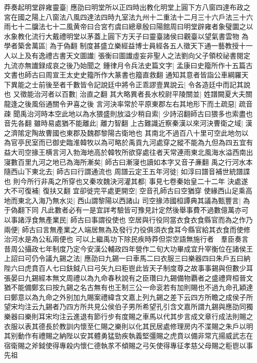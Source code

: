 莽奏起明堂辟雍靈臺|{
	應劭曰明堂所以正四時出教化明堂上圓下方八窗四達布政之宮在國之陽上八窗法八風四達法四時九室法九州十二重法十二月三十六戶法三十六雨七十二牖法七十二風黄帝曰合宮冇虞曰總章殷曰陽館周曰明堂辟雍者象璧圜之以水象教化流行大戴禮明堂以茅蓋上圓下方天子曰靈臺諸侯曰觀臺以望氣書雲物}
為學者築舍萬區|{
	為于偽翻}
制度甚盛立樂經益博士員經各五人徵天下通一藝教授十一人以上及有逸禮古書天文圖䜟|{
	張衡曰圖䜟虛妄非聖人之法劉向父子領校祕書閱定九流亦無䜟録成哀之後乃始聞之}
鍾律月令兵法史篇文字|{
	孟康曰史籀所作十五篇古文書也師古曰周宣王太史史籀所作大篆書也籀直救翻}
通知其意者皆詣公車綱羅天下異能之士前後至者千數皆令記說廷中將令正乖謬壹異說云|{
	令各造廷中而記其說也}
又徵能治河者以百數|{
	治直之翻}
其大略異者長水校尉平陵關並|{
	姓譜闕夏大夫關龍逢之後風俗通關令尹喜之後}
言河決率常於平原東郡左右其地形下而土疏惡|{
	疏音疎}
聞禹治河時本空此地以為水猥盛則放溢少稍自索|{
	少詩沼翻師古曰猥多也索盡也音先各翻}
雖時易處猶不能離此|{
	離力智翻}
上古難識近察秦漢以來河決曹衛之域|{
	漢之濟隂定陶故曹國也東郡及魏郡黎陽古衛地也}
其南北不過百八十里可空此地勿以為官亭民室而已御史臨淮韓牧以為可略於禹貢九河處穿之縱不能為九但為四五宜有益大司空掾王横言河入勃海地高於韓牧所欲穿處往者天常連雨東北風海水溢西南出寖數百里九河之地已為海所漸矣|{
	師古曰漸寖也讀如本字又音子亷翻}
禹之行河水本隨西山下東北去|{
	師古曰行謂通流也}
周譜云定王五年河徙|{
	如淳曰譜音補世統譜諜也}
則今所行非禹之所穿也又秦攻魏決河灌其都|{
	事見七卷秦始皇二十二年}
決處遂大不可復補|{
	復扶又翻}
宜卻徙完平處更開空|{
	空音孔師古曰空猶穿}
使緣西山足乘高地而東北入海乃無水災|{
	西山謂黎陽以西諸山}
司空掾沛國桓譚典其議為甄豐言|{
	為于偽翻下同}
凡此數者必有一是宜詳考驗皆可豫見計定然後舉事費不過數億萬亦可以事諸浮食無產業民|{
	師古曰事謂役使也}
空居與行役同當衣食衣食縣官而為之作乃兩便|{
	師古曰言無產業之人端居無為及發行力役俱須衣食耳今縣官給其衣食而使修治河水是為公私兩便也}
可以上繼禹功下除民疾時莽但崇空語無施行者　羣臣奏言昔周公攝政七年制度乃定今安漢公輔政四年營作二旬大功畢成宜升宰衡位在諸侯王上詔曰可仍令議九錫之法|{
	應劭曰九錫一曰車馬二曰衣服三曰樂器四曰朱戶五曰納陛六曰虎賁百人七曰鈇鉞八曰弓矢九曰秬鬯此皆天子制度尊之故事事錫與但數少耳張晏曰九錫經本無文周禮以為九命春秋說有之臣瓚曰九錫備物覇者之盛禮齊桓晉文猶不能備鄭玄曰按九錫之名古無有也王制三公一命衮若有加則賜也不過九命孔穎達曰鄭意以為九命之外别加九賜案禮緯含文嘉上列九錫之差下云四方所瞻之成侯子所望宋均注云九錫者乃四方所共見公侯伯子男所希望孔引含文嘉所謂九錫與應劭同獨樂器曰樂則耳宋均注云進退有節行步有度賜之車馬以代其步言成文章行成法則賜之衣服以表其德長於教訓内懷至仁賜之樂則以化其民居處修理房内不渫賜之朱戶以明其别動作有禮賜之納陛以安其體勇猛勁疾執義堅彊賜之虎賁以備非常亢揚威武志在宿衛賜之斧鉞使得專殺内懷仁德執㒸不傾賜之弓矢使得專征孝慈父母賜之秬鬯以事先祖}
